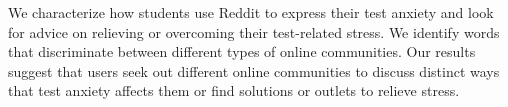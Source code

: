 We characterize how students use Reddit to express their test anxiety and look for advice on relieving or overcoming their test-related stress. We identify words that discriminate between different types of online communities. Our results suggest that users seek out different online communities to discuss distinct ways that test anxiety affects them or find solutions or outlets to relieve stress.
